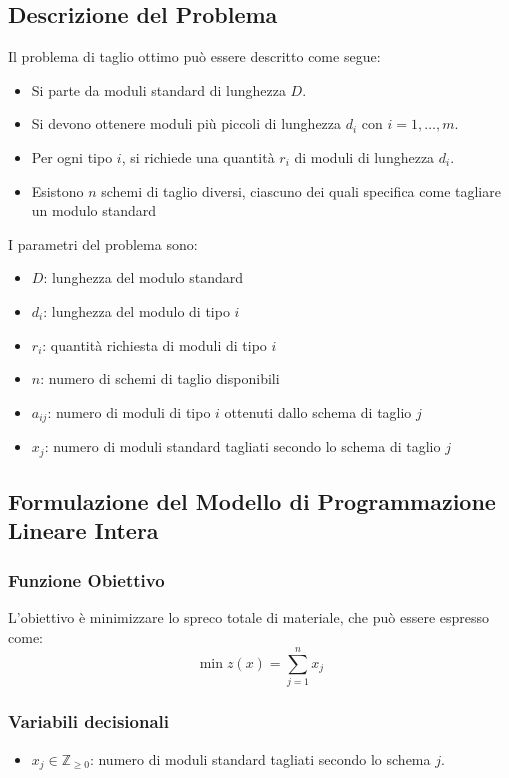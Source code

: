 \subsection{Descrizione del Problema}
Il problema di taglio ottimo può essere descritto come segue:
\begin{itemize}
    \item Si parte da moduli standard di lunghezza $D$.
    \item Si devono ottenere moduli più piccoli di lunghezza $d_i$ con $i = 1, \ldots, m$.
    \item Per ogni tipo $i$, si richiede una quantità $r_i$ di moduli di lunghezza $d_i$.
    \item Esistono $n$ schemi di taglio diversi, ciascuno dei quali specifica come tagliare un modulo standard
\end{itemize}

I parametri del problema sono:
\begin{itemize}
    \item $D$: lunghezza del modulo standard
    \item $d_i$: lunghezza del modulo di tipo $i$
    \item $r_i$: quantità richiesta di moduli di tipo $i$
    \item $n$: numero di schemi di taglio disponibili
    \item $a_{ij}$: numero di moduli di tipo $i$ ottenuti dallo schema di taglio $j$
    \item $x_j$: numero di moduli standard tagliati secondo lo schema di taglio $j$
\end{itemize}

\subsection{Formulazione del Modello di Programmazione Lineare Intera}
\subsubsection{Funzione Obiettivo}
L'obiettivo è minimizzare lo spreco totale di materiale, che può essere espresso come:
\[
\min z(x) = \sum_{j=1}^{n} x_j
\]

\subsubsection{Variabili decisionali}
\begin{itemize}
    \item $x_j \in \mathbb{Z}_{\geq 0}$: numero di moduli standard tagliati secondo lo schema $j$.
\end{itemize}

